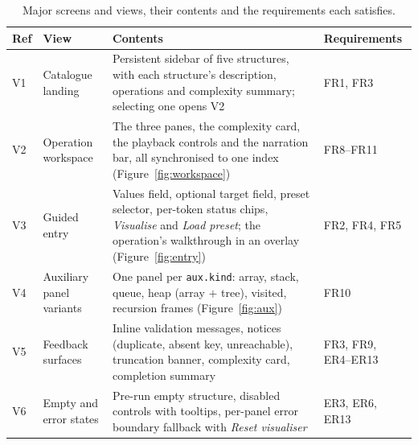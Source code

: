 \documentclass[11pt,a4paper]{article}
\newcommand{\ct}[1]{\texttt{#1}}
\begin{document}
\begin{table}[H]
\centering
\small
\setlength{\tabcolsep}{4pt}
\begin{tabular}{@{}L{1.1cm}L{3.2cm}L{5.2cm}L{5.0cm}@{}}
\toprule
\textbf{Ref} & \textbf{View} & \textbf{Contents} & \textbf{Requirements} \\
\midrule
V1 & Catalogue landing & Persistent sidebar of five structures, with each structure's
description, operations and complexity summary; selecting one opens V2 &
FR1, FR3 \\
V2 & Operation workspace & The three panes, the complexity card, the playback controls and the
narration bar, all synchronised to one index (Figure~\ref{fig:workspace}) &
FR8--FR11 \\
V3 & Guided entry & Values field, optional target field, preset selector, per-token status
chips, \emph{Visualise} and \emph{Load preset}; the operation's walkthrough in an overlay
(Figure~\ref{fig:entry}) & FR2, FR4, FR5 \\
V4 & Auxiliary panel variants & One panel per \ct{aux.kind}: array, stack, queue, heap
(array $+$ tree), visited, recursion frames (Figure~\ref{fig:aux}) & FR10 \\
V5 & Feedback surfaces & Inline validation messages, notices (duplicate, absent key,
unreachable), truncation banner, complexity card, completion summary & FR3, FR9, ER4--ER13 \\
V6 & Empty and error states & Pre-run empty structure, disabled controls with tooltips,
per-panel error boundary fallback with \emph{Reset visualiser} & ER3, ER6, ER13 \\
\bottomrule
\end{tabular}
\caption{Major screens and views, their contents and the requirements each satisfies.}
\label{tab:screens}
\end{table}
\end{document}
